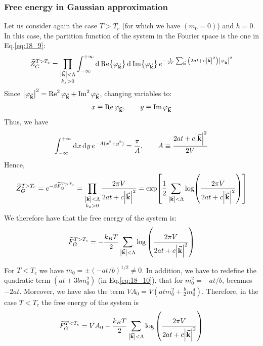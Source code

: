 \documentclass[../main/main.tex]{subfiles}
\begin{document}
\subsubsection{Free energy in Gaussian approximation}
Let us consider again the case \( T>T_c \) (for which we have \( (m_0=0) \)) and \( h=0 \). In this case, the partition function of the system in the Fourier space is the one in Eq.\eqref{eq:18_9}:
\begin{equation*}
  \widetilde{Z}_G^{T>T_c} = \prod_{\substack{ \abs{\va{k}} < \Lambda   \\ k_z >0 } }^{}
   \int_{-\infty }^{+\infty } \dd[]{\Re {\varphi _{\va{k}}}}  \dd[]{\Im {\varphi _{\va{k}}}} e^{- \frac{1}{2V} \sum_{\va{k}}^{} \qty(2at+c \abs{\va{k}}^2 ) \abs{\varphi _{\va{k}}}^2}
\end{equation*}
Since \( \abs{\varphi_{\va{k}}}^2 = \Re^2 \varphi_{\va{k}} + \Im^2 \varphi_{\va{k}} \), changing variables to:
\begin{equation*}
   x \equiv  \Re \varphi _{\va{k}}, \qquad  y \equiv  \Im \varphi _{\va{k}}
\end{equation*}
Thus, we have
\begin{equation*}
  \int_{-\infty }^{+\infty } \dd[]{x} \dd[]{y} e^{-A (x^2+y^2)} = \frac{\pi }{A}, \qquad A \equiv  \frac{2at+c \abs{\va{k}}^2}{2V}
\end{equation*}
Hence,
\begin{equation*}
    \widetilde{Z}_{G}^{T>T_c} = e^{-\beta \widetilde{F}_{G}^{T>T_c} } =  \prod_{\substack{ \abs{\va{k}} < \Lambda   \\ k_z >0 } }^{} \frac{2 \pi V  }{ 2at+c \abs{\va{k}}^2 }
    = \exp [\frac{1}{2} \sum_{\abs{\va{k}}<\Lambda  }^{} \log (\frac{2 \pi V}{2 a t + c \abs{\va{k}}^2 })   ]
\end{equation*}
We therefore have that the free energy of the system is:
\begin{equation}
  \widetilde{F}_{G}^{T>T_c} = - \frac{k_B T}{2}  \sum_{\abs{\va{k}}< \Lambda  }^{}
  \log{\qty(\frac{2 \pi V}{2 a t + c \abs{\va{k}}^2 })}
\end{equation}

\begin{remark}
For \( T<T_c \) we have \( m_0 = \pm (-at/b)^{1/2} \neq 0 \). In addition, we have to redefine the quadratic term \( (at+3bm_0^2) \) (in Eq.\eqref{eq:18_10}), that for \( m_0^2 = - at/b \), becames \( -2at \). Moreover, we have also the term \( V A_0 = V (atm_0^2 + \frac{b}{2} m_0^4) \).
Therefore, in the case \( T<T_c \) the free energy of the system is
\begin{equation}
  \widetilde{F}_{G}^{T<T_c} = V A_0  - \frac{k_B T}{2}  \sum_{\abs{\va{k}}< \Lambda  }^{}
  \log{\qty(\frac{2 \pi V}{ 2 a t + c \abs{\va{k}}^2 })}
\end{equation}
\end{remark}
\end{document}
